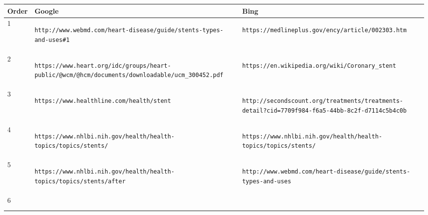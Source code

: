 \documentclass[a4paper, 11pt]{article}
\begin{document}
\begin{longtable}{ |p{1cm}|p{6cm}|p{6cm}| } 
\hline
Order & Google & Bing \\
 \hline 
 1 & 
 \begin{lstlisting}[breakatwhitespace=〈false)]
http://www.webmd.com/heart-disease/guide/stents-types-and-uses#1
\end{lstlisting} 
&
 \begin{lstlisting}[breakatwhitespace=〈false)]
https://medlineplus.gov/ency/article/002303.htm
\end{lstlisting} 
 \\
 \hline 
 2 & 
\begin{lstlisting}[breakatwhitespace=〈false)] 
https://www.heart.org/idc/groups/heart-public/@wcm/@hcm/documents/downloadable/ucm_300452.pdf
\end{lstlisting}
&
 \begin{lstlisting}[breakatwhitespace=〈false)]
https://en.wikipedia.org/wiki/Coronary_stent
\end{lstlisting} 
  \\ 
 \hline 
 3 & 
\begin{lstlisting}[breakatwhitespace=〈false)]  
https://www.healthline.com/health/stent
 \end{lstlisting}
 &
 \begin{lstlisting}[breakatwhitespace=〈false)]
http://secondscount.org/treatments/treatments-detail?cid=7709f984-f6a5-44bb-8c2f-d7114c5b4c0b
\end{lstlisting} 
 \\
 \hline 
 4 & 
 \begin{lstlisting}[breakatwhitespace=〈false)]
https://www.nhlbi.nih.gov/health/health-topics/topics/stents/
\end{lstlisting}
&
 \begin{lstlisting}[breakatwhitespace=〈false)]
https://www.nhlbi.nih.gov/health/health-topics/topics/stents/
\end{lstlisting} 
\\ 
 \hline
 5 & 
 \begin{lstlisting}[breakatwhitespace=〈false)] 
https://www.nhlbi.nih.gov/health/health-topics/topics/stents/after
  \end{lstlisting}
  &
 \begin{lstlisting}[breakatwhitespace=〈false)]
http://www.webmd.com/heart-disease/guide/stents-types-and-uses
\end{lstlisting} 
 \\
 \hline 
 6 &  
 \begin{lstlisting}[breakatwhitespace=〈false)] 

\end{lstlisting}
\end{longtable}
\end{document}
